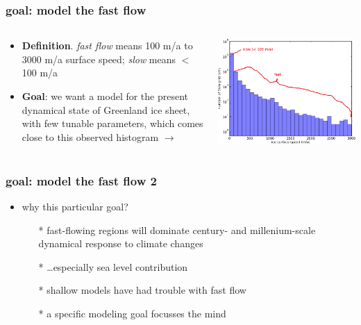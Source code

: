 \documentclass{beamer}
\begin{document}
\begin{frame}
  \frametitle{goal: model the fast flow}

\begin{columns}
\begin{column}{0.4\textwidth}
\begin{itemize}
\item \textbf{Definition}.  \emph{fast flow} means 100 m/a to 3000 m/a surface speed; \emph{slow} means $<$ 100 m/a
\item \textbf{Goal}: we want a model for the present dynamical state of Greenland ice sheet, with few tunable parameters, which comes close to this observed histogram $\to$
\end{itemize}
\end{column}

\begin{column}{0.6\textwidth}
  \includegraphics[width=1.0\textwidth]{joughin_histogram}
\end{column}
\end{columns}
\end{frame}

\begin{frame}
  \frametitle{goal: model the fast flow 2}

\begin{itemize}
\item why this particular goal?
  \begin{itemize} 
    \item[*] fast-flowing regions will dominate century- and millenium-scale dynamical response to climate changes
    \item[*] \dots especially sea level contribution
    \item[*] shallow models have had trouble with fast flow
    \item[*] a specific modeling goal focusses the mind
  \end{itemize} \small
\end{itemize} 
\end{frame}
\end{document}
